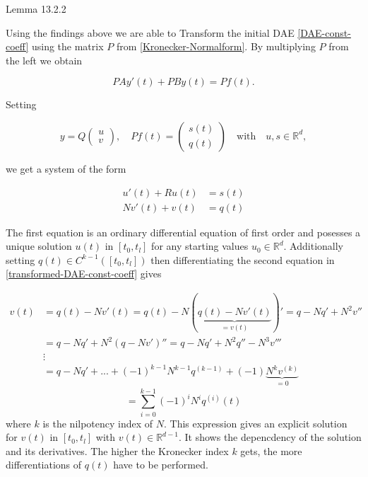 

Lemma 13.2.2

Using the findings above we are able to Transform the initial DAE \ref{DAE-const-coeff} using the matrix $P$ from \ref{Kronecker-Normalform}. By multiplying $P$ from the left we obtain

\begin{displaymath}
	P A y'(t) + P B y(t) = P f(t) .
\end{displaymath}

Setting

\begin{displaymath}
	y = Q
	\left(
	\begin{matrix}
		u \\
		v
	\end{matrix}  
	\right) 
	, \quad
	Pf(t) = 
	\left(
	\begin{matrix}
		s(t) \\
		q(t)
	\end{matrix}
	\right)
	\quad \text{with} \quad
	u,s \in \mathbb{R}^d ,
\end{displaymath}

we get a system of the form

\begin{equation}
	\label{transformed-DAE-const-coeff}
	\begin{aligned}
		u'(t) + Ru(t) &= s(t) \\
		Nv'(t) + v(t) &= q(t)
	\end{aligned}
\end{equation}

The first equation is an ordinary differential equation of first order and posesses a unique solution $u(t)$ in $[t_0,t_l]$ for any starting values $u_0 \in \mathbb{R}^d$. Additionally setting $q(t) \in C^{k-1}([t_0,t_l])$ then differentiating the second equation in \ref{transformed-DAE-const-coeff} gives

\begin{displaymath}
	\begin{aligned}
		v(t) &= q(t) - Nv'(t) = q(t) - N(\underbrace{q(t)-Nv'(t)}_{=v(t)})' = q-Nq'+N^2v'' \\
		&= q-Nq'+N^2(q-Nv')'' = q-Nq'+N^2q''-N^3v''' \\
		&\vdots \\
		&= q-Nq'+...+(-1)^{k-1}N^{k-1}q^{(k-1)}+(-1) \underbrace{N^kv^{(k)}}_{=0}
	\end{aligned}
\end{displaymath}
\begin{equation}
	\label{solution-to-transformed-DAE-const-coeff-part2}
	= \sum_{i=0}^{k-1} (-1)^iN^iq^{(i)}(t) 
\end{equation}
where $k$ is the nilpotency index of $N$. This expression gives an explicit solution for $v(t)$ in $[t_0,t_l]$ with $v(t) \in \mathbb{R}^{d-1}$. It shows the depencdency of the solution and its derivatives. The higher the Kronecker index $k$ gets, the more differentiations of $q(t)$ have to be performed.

